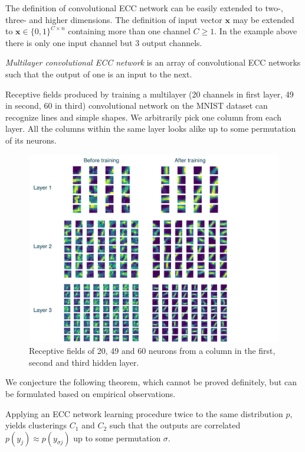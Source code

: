 \documentclass[oneside,english,logo]{amuthesis}
\begin{document}
The definition of convolutional ECC network can be easily extended to two-, three- and higher dimensions.
The definition of input vector $\boldsymbol{x}$ may be extended to  $\boldsymbol{x} \in \{0,1\}^{C\times n}$ containing more than one channel $C\ge 1$. In the example above there is only one input channel but $3$ output channels.
\begin{definition}
\textit{Multilayer convolutional ECC network} is an array of convolutional ECC networks such that the output of one is an input to the next.
\end{definition}
\begin{example}
Receptive fields produced by training a multilayer (20 channels in first layer, 49 in second, 60 in third) convolutional network on the MNIST dataset can recognize lines and simple shapes. We arbitrarily pick one column from each layer. All the columns within the same layer looks alike up to some permutation of its neurons.
\begin{figure}[!htbp]
	\centering
	\includegraphics[width=15cm]{receptive_fields}
	\caption{Receptive fields of 20, 49 and 60 neurons from a column in the first, second and third hidden layer.}
	\label{fig:receptive_fields}
\end{figure} 
\end{example}
We conjecture the following theorem, which cannot be proved definitely, but can be formulated based on empirical observations. 
\begin{theorem}
Applying an ECC network learning procedure twice to the same distribution $p$, yields clusterings $C_1$ and $C_2$ such that the outputs are correlated $p(y_j)\approx p(y_{\sigma j})$ up to some permutation $\sigma$.
\end{theorem}
\end{document}
